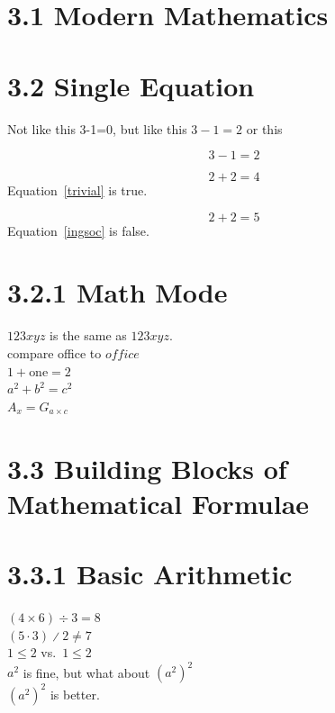 \documentclass{article}
\begin{document}
\section{3.1 Modern Mathematics}

\section{3.2 Single Equation}

Not like this 3-1=0,
but like this \(3-1=2\)
or this 

\[
  3 - 1 = 2
\]

\begin{equation}
    \label{trivial}
    2 + 2 = 4 
\end{equation}
Equation~\ref{trivial}
is true.

\begin{equation}
    \tag{Ingsoc's theorem}
    \label{ingsoc}
    2 + 2 = 5
\end{equation}
Equation~\eqref{ingsoc} is false.

\section{3.2.1 Math Mode}

\(123xyz\) is the same as \(
  1 2 3 x y z
\).\\[1cm]

compare office to \(office\)\\[0.5cm]
\( 1 + \text{one} = 2\)\\[0.5cm]

\( a^2 + b^2 = c^2\)\\[0.5cm]
\(A_x = G_{a\times c}\)

\section{3.3 Building Blocks of Mathematical Formulae}

\section{3.3.1 Basic Arithmetic}

\((4 \times 6) \div 3 = 8\)\\[0.5cm]
\((5 \cdot 3) \divslash 2 \not= 7\)\\[0.5cm]
\(1 \leq 2 \) vs.\
\(1 \leqslant 2 \)\\[0.5cm]

\( a^2 \) is fine, but what about \((a^2)^2\)\\[0.5cm]
\({(a^2)}^2\) is better.\\[0.5cm]
\end{document}
